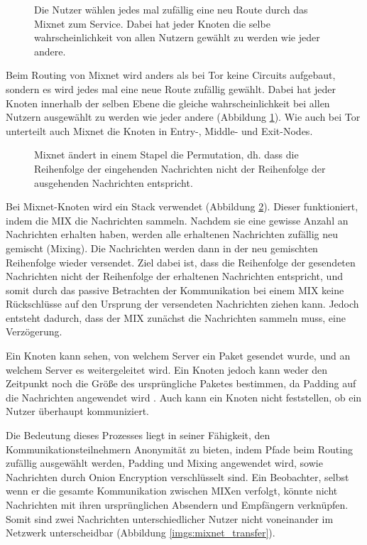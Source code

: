 \begin{figure}[h!]
    \centering
    
    \caption{Die Nutzer wählen jedes mal zufällig eine neu Route durch das Mixnet zum Service. Dabei hat jeder Knoten die selbe wahrscheinlichkeit von allen Nutzern gewählt zu werden wie jeder andere.}
    \label{imgs:mixnet}
\end{figure}

Beim Routing von Mixnet wird anders als bei Tor keine Circuits aufgebaut, sondern es wird jedes mal eine neue Route zufällig gewählt. Dabei hat jeder Knoten innerhalb der selben Ebene die gleiche wahrscheinlichkeit bei allen Nutzern ausgewählt zu werden wie jeder andere (Abbildung \ref{imgs:mixnet}). Wie auch bei Tor unterteilt auch Mixnet die Knoten in Entry-, Middle- und Exit-Nodes.

\begin{figure}[h!]
    \centering
    
    \caption{Mixnet ändert in einem Stapel die Permutation, dh. dass die Reihenfolge der eingehenden Nachrichten nicht der Reihenfolge der ausgehenden Nachrichten entspricht.}
    \label{imgs:mixnet_stack}
\end{figure}

Bei Mixnet-Knoten wird ein Stack verwendet (Abbildung \ref{imgs:mixnet_stack}). Dieser funktioniert, indem die MIX die Nachrichten sammeln. Nachdem sie eine gewisse Anzahl an Nachrichten erhalten haben, werden alle erhaltenen Nachrichten zufällig neu gemischt (Mixing). Die Nachrichten werden dann in der neu gemischten Reihenfolge wieder versendet. Ziel dabei ist, dass die Reihenfolge der gesendeten Nachrichten nicht der Reihenfolge der erhaltenen Nachrichten entspricht, und somit durch das passive Betrachten der Kommunikation bei einem MIX keine Rückschlüsse auf den Ursprung der versendeten Nachrichten ziehen kann. Jedoch entsteht dadurch, dass der MIX zunächst die Nachrichten sammeln muss, eine Verzögerung.

Ein Knoten kann sehen, von welchem Server ein Paket gesendet wurde, und an welchem Server es weitergeleitet wird. Ein Knoten jedoch kann weder den Zeitpunkt noch die Größe des ursprüngliche Paketes bestimmen, da Padding auf die Nachrichten angewendet wird . Auch kann ein Knoten nicht feststellen, ob ein Nutzer überhaupt kommuniziert.

Die Bedeutung dieses Prozesses liegt in seiner Fähigkeit, den Kommunikationsteilnehmern Anonymität zu bieten, indem Pfade beim Routing zufällig ausgewählt werden, Padding und Mixing angewendet wird, sowie Nachrichten durch Onion Encryption verschlüsselt sind. Ein Beobachter, selbst wenn er die gesamte Kommunikation zwischen MIXen verfolgt, könnte nicht Nachrichten mit ihren ursprünglichen Absendern und Empfängern verknüpfen. Somit sind zwei Nachrichten unterschiedlicher Nutzer nicht voneinander im Netzwerk unterscheidbar (Abbildung \ref{imgs:mixnet_transfer}).

